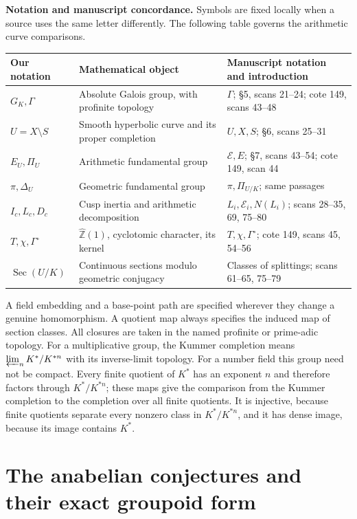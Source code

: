 \documentclass[11pt,oneside]{article}
\begin{document}
\smallskip
\noindent\textbf{Notation and manuscript concordance.}
Symbols are fixed locally when a source uses the same letter differently.
The following table governs the arithmetic curve comparisons.
\begin{center}\small
\begin{tabular}{@{}p{}p{}p{}@{}}
\toprule
Our notation & Mathematical object & Manuscript notation and introduction\\
\midrule
$G_K,\Gamma$ & Absolute Galois group, with profinite topology &
$\Gamma$; \S5, scans 21--24; cote 149, scans 43--48\\
$U=X\setminus S$ & Smooth hyperbolic curve and its proper completion &
$U,X,S$; \S6, scans 25--31\\
$E_U,\Pi_U$ & Arithmetic fundamental group &
$\mathcal E,E$; \S7, scans 43--54; cote 149, scan 44\\
$\pi,\Delta_U$ & Geometric fundamental group &
$\pi,\Pi_{U/K}$; same passages\\
$I_c,L_c,D_c$ & Cusp inertia and arithmetic decomposition &
$L_i,\mathcal E_i,N(L_i)$; scans 28--35, 69, 75--80\\
$T,\chi,\Gamma^\circ$ & $\widehat{\mathbb Z}(1)$, cyclotomic character, its kernel &
$T,\chi,\Gamma^\circ$; cote 149, scans 45, 54--56\\
$\operatorname{Sec}(U/K)$ & Continuous sections modulo geometric conjugacy &
Classes of splittings; scans 61--65, 75--79\\
\bottomrule
\end{tabular}
\end{center}
\noindent
A field embedding and a base-point path are specified wherever they
change a genuine homomorphism. A quotient map always specifies the
induced map of section classes. All closures are taken in the named
profinite or prime-adic topology.
For a multiplicative group, the Kummer completion means
$\varprojlim_n K^*/K^{*n}$ with its inverse-limit topology.
For a number field this group need not be compact.
Every finite quotient of $K^*$ has an exponent $n$ and therefore
factors through $K^*/K^{*n}$; these maps give the comparison
from the Kummer completion to the completion over all finite
quotients. It is injective, because finite quotients separate
every nonzero class in $K^*/K^{*n}$, and it has dense image,
because its image contains $K^*$.
\newpage
\tableofcontents
\newpage
\section{The anabelian conjectures and their exact groupoid form}
\end{document}
